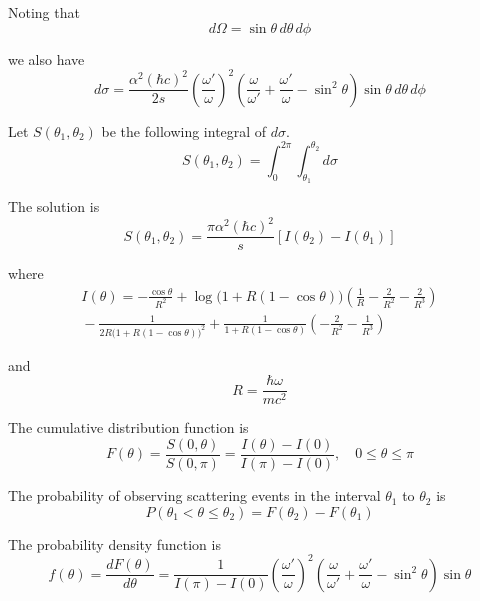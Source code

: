Noting that
\begin{equation*}
d\Omega=\sin\theta\,d\theta\,d\phi
\end{equation*}

we also have
\begin{equation*}
d\sigma
=\frac{\alpha^2(\hbar c)^2}{2s}
\left(\frac{\omega'}{\omega}\right)^2
\left(
\frac{\omega}{\omega'}+\frac{\omega'}{\omega}-\sin^2\theta
\right)
\sin\theta\,d\theta\,d\phi
\end{equation*}

Let $S(\theta_1,\theta_2)$ be the following integral of $d\sigma$.
\begin{equation*}
S(\theta_1,\theta_2)=\int_0^{2\pi}\int_{\theta_1}^{\theta_2}d\sigma
\end{equation*}

The solution is
\begin{equation*}
S(\theta_1,\theta_2)=\frac{\pi\alpha^2(\hbar c)^2}{s}[I(\theta_2)-I(\theta_1)]
\end{equation*}

where
\begin{multline*}
I(\theta)=-\frac{\cos\theta}{R^2}
+\log\bigl(1+R(1-\cos\theta)\bigr)\left(\frac{1}{R}-\frac{2}{R^2}-\frac{2}{R^3}\right)
\\
{}-\frac{1}{2R\bigl(1+R(1-\cos\theta)\bigr)^2}
+\frac{1}{1+R(1-\cos\theta)}\left(-\frac{2}{R^2}-\frac{1}{R^3}\right)
\end{multline*}

and
\begin{equation*}
R=\frac{\hbar\omega}{mc^2}
\end{equation*}

The cumulative distribution function is
\begin{equation*}
F(\theta)
=\frac{S(0,\theta)}{S(0,\pi)}
=\frac{I(\theta)-I(0)}{I(\pi)-I(0)},
\quad
0\le\theta\le\pi
\end{equation*}

The probability of observing scattering events in the interval $\theta_1$ to $\theta_2$ is
\begin{equation*}
P(\theta_1<\theta\le\theta_2)=F(\theta_2)-F(\theta_1)
\end{equation*}

The probability density function is
\begin{equation*}
f(\theta)=\frac{dF(\theta)}{d\theta}
=\frac{1}{I(\pi)-I(0)}
\left(\frac{\omega'}{\omega}\right)^2
\left(\frac{\omega}{\omega'}+\frac{\omega'}{\omega}-\sin^2\theta\right)
\sin\theta
\end{equation*}

